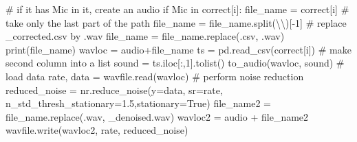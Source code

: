 \documentclass[
  letterpaper,
  DIV=11,
  numbers=noendperiod]{scrreprt}
\newenvironment{Shaded}{\begin{snugshade}}{\end{snugshade}}
\newcommand{\BuiltInTok}[1]{\textcolor[rgb]{0.00,0.23,0.31}{#1}}
\newcommand{\CharTok}[1]{\textcolor[rgb]{0.13,0.47,0.30}{#1}}
\newcommand{\CommentTok}[1]{\textcolor[rgb]{0.37,0.37,0.37}{#1}}
\newcommand{\ControlFlowTok}[1]{\textcolor[rgb]{0.00,0.23,0.31}{#1}}
\newcommand{\DecValTok}[1]{\textcolor[rgb]{0.68,0.00,0.00}{#1}}
\newcommand{\FloatTok}[1]{\textcolor[rgb]{0.68,0.00,0.00}{#1}}
\newcommand{\KeywordTok}[1]{\textcolor[rgb]{0.00,0.23,0.31}{#1}}
\newcommand{\NormalTok}[1]{\textcolor[rgb]{0.00,0.23,0.31}{#1}}
\newcommand{\OperatorTok}[1]{\textcolor[rgb]{0.37,0.37,0.37}{#1}}
\newcommand{\StringTok}[1]{\textcolor[rgb]{0.13,0.47,0.30}{#1}}
\newcommand{\VariableTok}[1]{\textcolor[rgb]{0.07,0.07,0.07}{#1}}
\begin{document}
\begin{Shaded}
\begin{Highlighting}[]
        \CommentTok{\# if it has Mic in it, create an audio}
        \ControlFlowTok{if} \StringTok{\textquotesingle{}Mic\textquotesingle{}} \KeywordTok{in}\NormalTok{ correct[i]:}
\NormalTok{            file\_name }\OperatorTok{=}\NormalTok{ correct[i]}
            \CommentTok{\# take only the last part of the path}
\NormalTok{            file\_name }\OperatorTok{=}\NormalTok{ file\_name.split(}\StringTok{\textquotesingle{}}\CharTok{\textbackslash{}\textbackslash{}}\StringTok{\textquotesingle{}}\NormalTok{)[}\OperatorTok{{-}}\DecValTok{1}\NormalTok{]}
            \CommentTok{\# replace \_corrected.csv by .wav}
\NormalTok{            file\_name }\OperatorTok{=}\NormalTok{ file\_name.replace(}\StringTok{\textquotesingle{}.csv\textquotesingle{}}\NormalTok{, }\StringTok{\textquotesingle{}.wav\textquotesingle{}}\NormalTok{)          }
            \BuiltInTok{print}\NormalTok{(file\_name)}
\NormalTok{            wavloc }\OperatorTok{=}\NormalTok{ audio}\OperatorTok{+}\NormalTok{file\_name}
\NormalTok{            ts }\OperatorTok{=}\NormalTok{ pd.read\_csv(correct[i])}
            \CommentTok{\# make second column into a list}
\NormalTok{            sound }\OperatorTok{=}\NormalTok{ ts.iloc[:,}\DecValTok{1}\NormalTok{].tolist()}
\NormalTok{            to\_audio(wavloc, sound)}
            \CommentTok{\# load data    }
\NormalTok{            rate, data }\OperatorTok{=}\NormalTok{ wavfile.read(wavloc)}
            \CommentTok{\# perform noise reduction}
\NormalTok{            reduced\_noise }\OperatorTok{=}\NormalTok{ nr.reduce\_noise(y}\OperatorTok{=}\NormalTok{data, sr}\OperatorTok{=}\NormalTok{rate, n\_std\_thresh\_stationary}\OperatorTok{=}\FloatTok{1.5}\NormalTok{,stationary}\OperatorTok{=}\VariableTok{True}\NormalTok{)}
\NormalTok{            file\_name2 }\OperatorTok{=}\NormalTok{ file\_name.replace(}\StringTok{\textquotesingle{}.wav\textquotesingle{}}\NormalTok{, }\StringTok{\textquotesingle{}\_denoised.wav\textquotesingle{}}\NormalTok{)}
\NormalTok{            wavloc2 }\OperatorTok{=}\NormalTok{ audio }\OperatorTok{+}\NormalTok{ file\_name2}
\NormalTok{            wavfile.write(wavloc2, rate, reduced\_noise)}


\end{Highlighting}
\end{Shaded}
\end{document}
